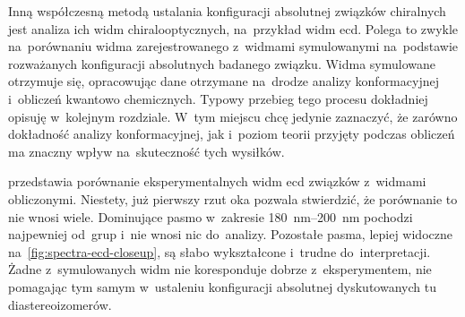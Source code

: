 Inną współczesną metodą ustalania konfiguracji absolutnej związków chiralnych jest analiza
  ich widm chiralooptycznych, na~przykład widm \gls{ecd}.
Polega to zwykle na~porównaniu widma zarejestrowanego z~widmami symulowanymi na~podstawie
  rozważanych konfiguracji absolutnych badanego związku.
Widma symulowane otrzymuje się, opracowując dane otrzymane na~drodze analizy konformacyjnej
  i~obliczeń kwantowo chemicznych.
Typowy przebieg tego procesu dokładniej opisuję w~kolejnym rozdziale. 
W~tym miejscu chcę jedynie zaznaczyć, że zarówno dokładność analizy konformacyjnej,
  jak i~poziom teorii przyjęty podczas obliczeń ma znaczny wpływ na~skuteczność tych wysiłków.

 przedstawia porównanie eksperymentalnych widm \gls{ecd} związków
   z~widmami obliczonymi.
Niestety, już pierwszy rzut oka pozwala stwierdzić, że porównanie to nie wnosi wiele.
Dominujące pasmo w~zakresie \SIrange{180}{200}{\nano\meter} pochodzi najpewniej od~grup
   i~nie wnosi nic do~analizy.
Pozostałe pasma, lepiej widoczne na~\cref{fig:spectra-ecd-closeup}, są słabo wykształcone
  i~trudne do~interpretacji.
Żadne z~symulowanych widm nie koresponduje dobrze z~eksperymentem, nie pomagając tym samym
  w~ustaleniu konfiguracji absolutnej dyskutowanych tu diastereoizomerów.

